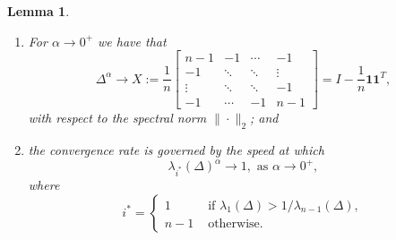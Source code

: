 \documentclass[a4paper,12pt]{article}
\newtheorem{lemma}{Lemma}
\newcommand{\fL}{\Delta^\alpha}
\begin{document}
\begin{lemma} \label{lemma:limit_fL_alpha_to_0}
\begin{enumerate}[label=\normalfont{(\alph*)}]
    \item For $\alpha \rightarrow 0^+$ we have that      
        \begin{equation*}
    \fL  \longrightarrow X:=\frac{1}{n}\begin{bmatrix}
             n-1 & -1 
             & \cdots &-1 \\
             -1 & \ddots & \ddots & \vdots \\
             \vdots & \ddots & \ddots  & -1 \\
             -1& \cdots& -1 & n-1
            \end{bmatrix} =  I - \frac{1}{n}\mathbf{1}\mathbf{1}^T,
               \end{equation*}
               with respect to the spectral norm $\|\cdot\|_2$; and
   \item the convergence rate is governed by the speed at which
\begin{equation*}
     \lambda_{i^*}(\Delta)^\alpha\longrightarrow 1, \text{ as } {\alpha \rightarrow 0^+},
\end{equation*}
where 
\begin{equation*}
i^* =
  \begin{cases}
    1 & \text{ if } \lambda_1(\Delta)> 1/\lambda_{n-1}(\Delta),\\
    n-1 & \text{ otherwise. }
\end{cases}  
\end{equation*}
\end{enumerate}
\end{lemma}
\end{document}
